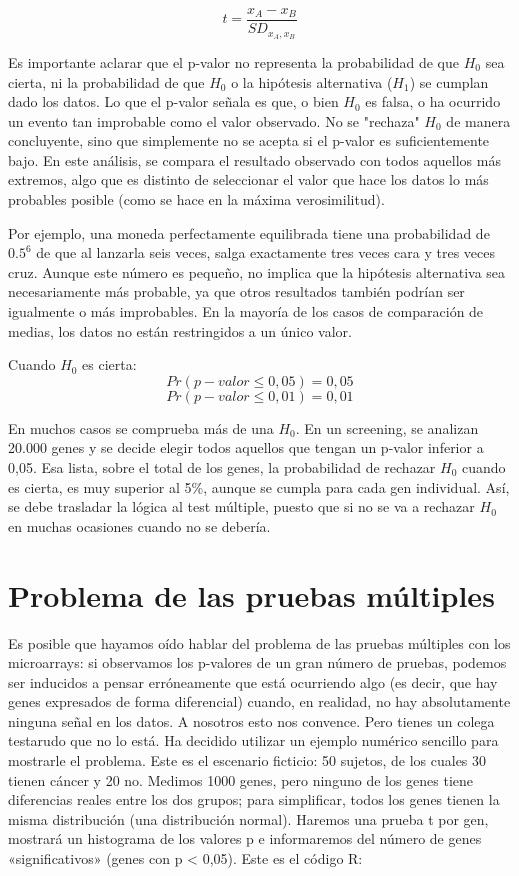 \documentclass{config/apuntes}\usepackage[]{graphicx}\usepackage[]{xcolor}
\begin{document}
\[
t = \frac{x_A - x_B}{SD_{x_A, x_B}}
\]

Es importante aclarar que el p-valor no representa la probabilidad de que $H_0$ sea cierta, ni la probabilidad de que $H_0$ o la hipótesis alternativa ($H_1$) se cumplan dado los datos. Lo que el p-valor señala es que, o bien $H_0$ es falsa, o ha ocurrido un evento tan improbable como el valor observado. No se "rechaza" $H_0$ de manera concluyente, sino que simplemente no se acepta si el p-valor es suficientemente bajo. En este análisis, se compara el resultado observado con todos aquellos más extremos, algo que es distinto de seleccionar el valor que hace los datos lo más probables posible (como se hace en la máxima verosimilitud).

Por ejemplo, una moneda perfectamente equilibrada tiene una probabilidad de $0.5^6$ de que al lanzarla seis veces, salga exactamente tres veces cara y tres veces cruz. Aunque este número es pequeño, no implica que la hipótesis alternativa sea necesariamente más probable, ya que otros resultados también podrían ser igualmente o más improbables. En la mayoría de los casos de comparación de medias, los datos no están restringidos a un único valor.

Cuando $H_0$ es cierta:
$$Pr(p-valor \leq 0,05) = 0,05$$
$$Pr(p-valor \leq 0,01) = 0,01$$

En muchos casos se comprueba más de una $H_0$. En un screening, se analizan 20.000 genes y se decide elegir todos aquellos que tengan un p-valor inferior a 0,05. Esa lista, sobre el total de los genes, la probabilidad de rechazar $H_0$ cuando es cierta, es muy superior al 5\%, aunque se cumpla para cada gen individual. Así, se debe trasladar la lógica al test múltiple, puesto que si no se va a rechazar $H_0$ en muchas ocasiones cuando no se debería.

\section{Problema de las pruebas múltiples}
Es posible que hayamos oído hablar del problema de las pruebas múltiples con los microarrays: si observamos los p-valores de un gran número de pruebas, podemos ser inducidos a pensar erróneamente que está ocurriendo algo (es decir, que hay genes expresados de forma diferencial) cuando, en realidad, no hay absolutamente ninguna señal en los datos. A nosotros esto nos convence. Pero tienes un colega testarudo que no lo está. Ha decidido utilizar un ejemplo numérico sencillo para mostrarle el problema. Este es el escenario ficticio: 50 sujetos, de los cuales 30 tienen cáncer y 20 no. Medimos 1000 genes, pero ninguno de los genes tiene diferencias reales entre los dos grupos; para simplificar, todos los genes tienen la misma distribución (una distribución normal). Haremos una prueba t por gen, mostrará un histograma de los valores p e informaremos del número de genes «significativos» (genes con p < 0,05). Este es el código R:
\end{document}
